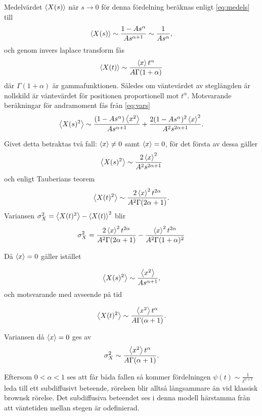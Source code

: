 Medelvärdet $\ev{X(s)}$ när $s\to 0$ för denna fördelning beräknas enligt \eqref{eq:medels} till
\begin{equation}
    \ev{X(s)} \sim \frac{1-As^{\alpha}}{As^{\alpha+1}} \sim \frac{1}{As^{\alpha}},
\end{equation}
och genom invers laplace transform fås 
\begin{equation}
    \ev{X(t)} \sim \frac{\ev{x}t^{\alpha}}{A\Gamma (1+\alpha)}
\end{equation}
där $\Gamma (1+\alpha)$ är gammafunktionen. Således om väntevärdet av steglängden är nollskild är väntevärdet för positionen proportionell mot $t^{\alpha}$. Motsvarande beräkningar för andramoment fås från \eqref{eq:vars}
\begin{equation}
   \ev{X(s)^2} \sim \frac{(1-As^{\alpha})\ev{x^2}}{As^{\alpha+1}}+\frac{2(1-As^{\alpha})^2\ev{x}^2}{A^2s^{2\alpha+1}}.
\end{equation}

Givet detta betraktas två fall: $\ev{x}\neq0$ samt $\ev{x}=0$, för det första av dessa gäller 
\begin{equation}
   \ev{X(s)^2} \sim \frac{2\ev{x}^2}{A^2s^{2\alpha+1}}
\end{equation}
och enligt Tauberians teorem 
\begin{equation}
   \ev{X(t)^2} \sim \frac{2\ev{x}^2t^{2\alpha}}{A^2\Gamma (2\alpha+1)}.
\end{equation}
Variansen $\sigma_X^2 = \ev{X(t)^2}-\ev{X(t)}^2$ blir 
\begin{equation}
    \sigma_X^2 = \frac{2\ev{x}^2t^{2\alpha}}{A^2\Gamma (2\alpha+1)}-\frac{\ev{x}^2t^{2\alpha}}{A^2\Gamma (1+\alpha)^2}
\end{equation}


Då $\ev{x}=0$ gäller istället 

\begin{equation}
   \ev{X(s)^2}\sim \frac{\ev{x^2}}{As^{\alpha+1}},
\end{equation}
och motsvarande med avseende på tid 

\begin{equation}
   \ev{X(t)^2} \sim \frac{\ev{x^2}t^{\alpha}}{A\Gamma (\alpha+1)}.
\end{equation}

Variansen då $\ev{x}=0$ ges av 
\begin{equation}
   \sigma_X^2 \sim \frac{\ev{x^2}t^{\alpha}}{A\Gamma (\alpha+1)}.
\end{equation}

Eftersom $0<\alpha<1$ ses att får båda fallen så kommer fördelningen $\psi(t)\sim \frac{1}{t^{\alpha+1}}$ leda till ett subdiffusivt beteende, rörelsen blir alltså långsammare än vid klassisk brownsk rörelse. Det subdiffusiva beteendet ses i denna modell härstamma från att väntetiden mellan stegen är odefinierad. 


